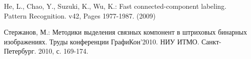 \documentclass{llncs}
\begin{document}

\begin{thebibliography}{5}

He, L., Chao, Y., Suzuki, K., Wu, K.:
Fast connected-component labeling. Pattern Recognition. v42, Pages 1977-1987. (2009)

Стержанов, М.:
Методики выделения связных компонент в штриховых бинарных изображениях.
Труды конференции ГрафиКон’2010. НИУ ИТМО. Санкт-Петербург. 2010, с. 169-174.

\end{thebibliography}
\end{document}
